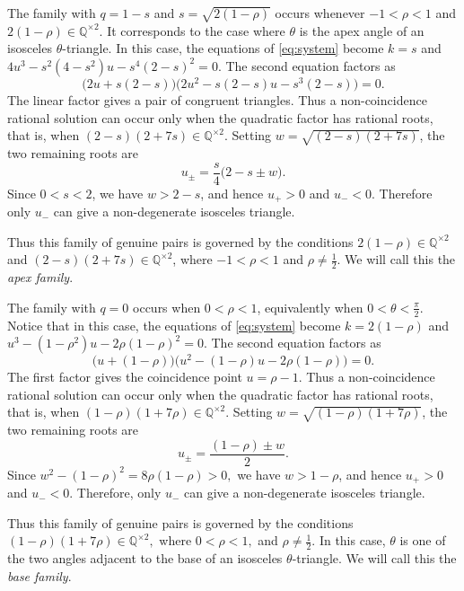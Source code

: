 \documentclass[11pt]{amsart}
\theoremstyle{plain}
\theoremstyle{remark}
\theoremstyle{plain}
\newcommand{\Q}{\mathbb{Q}}
\begin{document}
The family with
$q=1-s$ and $s=\sqrt{2(1-\rho)}$
occurs whenever
$-1<\rho<1$ and $2(1-\rho)\in\Q^{\times2}$.
It corresponds to the case where $\theta$ is the apex angle of an
isosceles $\theta$-triangle. In this case, the equations
of \eqref{eq:system} become
$k=s$ and  $4u^{3}-s^{2}(4-s^{2})u-s^{4}(2-s)^{2}=0.$
The second equation factors as
\begin{equation}\label{eq:apex}
\bigl(2u+s(2-s)\bigr)\bigl(2u^{2}-s(2-s)u-s^{3}(2-s)\bigr)=0.
\end{equation}
The linear factor gives
a pair of congruent triangles. Thus a non-coincidence rational solution
can occur only when the quadratic factor has rational roots, that is, when
$(2-s)(2+7s)\in\Q^{\times 2}$.
Setting $w=\sqrt{(2-s)(2+7s)}$, the two remaining roots are
\begin{equation}\label{eq:rootapex}
u_{\pm}=\frac{s}{4}\bigl(2-s\pm w\bigr).
\end{equation}
Since $0<s<2$, we have $w>2-s$, and hence $u_{+}>0$ and $u_{-}<0$. Therefore only $u_{-}$ can give a
non-degenerate isosceles triangle.

Thus this family of genuine pairs is
governed by the conditions
$2(1-\rho)\in\Q^{\times 2}$ and $ (2-s)(2+7s)\in\Q^{\times 2}$, where
$-1<\rho<1$ and  $\rho\neq\tfrac12.$
We will call this the \emph{apex family}.

The family with $q=0$ occurs when $0<\rho<1$, equivalently when
$0<\theta<\frac{\pi}{2}$. Notice that in this case,  the equations
of \eqref{eq:system} become
$k=2(1-\rho)$ and $u^3-(1-\rho^2)u-2\rho(1-\rho)^2=0$.
The second equation factors as
\begin{equation}\label{eq:base}
\bigl(u+(1-\rho)\bigr)
\bigl(u^2-(1-\rho)u-2\rho(1-\rho)\bigr)=0.
\end{equation}
The first factor gives the coincidence point $u=\rho-1$. Thus a
non-coincidence rational solution can occur only when the quadratic
factor has rational roots, that is, when
$(1-\rho)(1+7\rho)\in\Q^{\times 2}.$
Setting $w=\sqrt{(1-\rho)(1+7\rho)}$, the two remaining roots are
\begin{equation}\label{eq:rootbase}
u_{\pm}=\frac{(1-\rho)\pm w}{2}.
\end{equation}
Since $w^2-(1-\rho)^2=8\rho(1-\rho)>0,$ we have \(w>1-\rho\), and hence \(u_+>0\) and $u_-<0$. Therefore, only $u_-$ can give a non-degenerate isosceles triangle.

Thus this
family of genuine pairs is governed by the conditions
$(1-\rho)(1+7\rho)\in\Q^{\times 2},$ where $0<\rho<1,$ and $ \rho\ne\frac12$.
In this case, $\theta$ is one of the two angles
adjacent to the base of an isosceles $\theta$-triangle. We will call
this the \emph{base family}.
\end{document}
